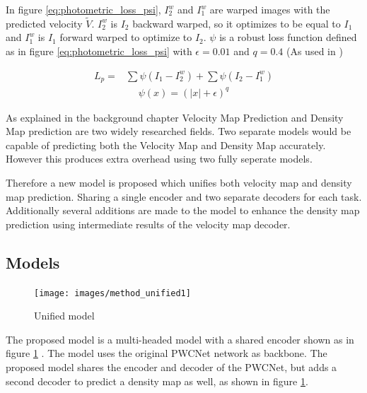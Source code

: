 In figure \ref{eq:photometric_loss_psi}, $I_{2}^{w}$ and $I_{1}^{w}$ are warped images with the predicted velocity $\widetilde{V}$. $I_{2}^{w}$ is $I_{2}$ backward warped, so it optimizes to be equal to $I_1$ and $I_{1}^{w}$ is $I_1$ forward warped to optimize to $I_2$. $\psi$ is a robust loss function defined as in figure \ref{eq:photometric_loss_psi} with $\epsilon = 0.01$ and $q=0.4$ (As used in \cite{liu_ddflow_2019})

\begin{equation}
\begin{aligned}
L_{p}=& \sum \psi\left(I_{1}-I_{2}^{w}\right) +\sum \psi\left(I_{2}-I_{1}^{w}\right)
\end{aligned}
\label{eq:photometric_loss}
\end{equation}
\begin{equation}
\begin{aligned}
\psi(x) = (|x| + \epsilon)^q
\end{aligned}
\label{eq:photometric_loss_psi}
\end{equation}

As explained in the background chapter Velocity Map Prediction and Density Map prediction are two widely researched fields. Two separate models would be capable of predicting both the Velocity Map and Density Map accurately. However this produces extra overhead using two fully seperate models.

Therefore a new model is proposed which unifies both velocity map and density map prediction. Sharing a single encoder and two separate decoders for each task. Additionally several additions are made to the model to enhance the density map prediction using intermediate results of the velocity map decoder.

\subsection{Models}
\begin{figure}[h]
\centering
\texttt{[image: images/method\_unified1]}
\caption{Unified model}
\label{fig:unified_model}
\end{figure}
The proposed model is a multi-headed model with a shared encoder shown as in figure \ref{fig:unified_model} . The model uses the original PWCNet network \cite{sun_pwc-net_2018} as backbone. The proposed model shares the encoder and decoder of the PWCNet, but adds a second decoder to predict a density map as well, as shown in figure \ref{fig:unified_model}.


